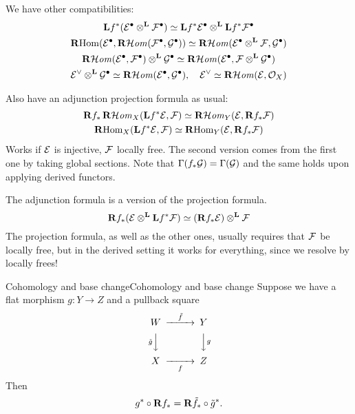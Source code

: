 
We have other compatibilities:
\begin{gather*}
    \mathbf{L} f^*(\mathcal{E}^\bullet\otimes^{\mathbf{L}}\mathcal{F}^\bullet)
        \simeq \mathbf{L} f^*\mathcal{E}^\bullet\otimes^{\mathbf{L}}\mathbf{L} f^*\mathcal{F}^\bullet \\
    \operatorname{\mathbf{R} Hom}(\mathcal{E}^\bullet,\operatorname{\mathbf{R}\mathcal{H}\mathit{om}}(\mathcal{F}^\bullet,\mathcal{G}^\bullet))
        \simeq \operatorname{\mathbf{R}\mathcal{H}\mathit{om}}(\mathcal{E}^\bullet\otimes^{\mathbf{L}}\mathcal{F},\mathcal{G}^\bullet) \\
    \operatorname{\mathbf{R}\mathcal{H}\mathit{om}}(\mathcal{E}^\bullet,\mathcal{F}^\bullet)\otimes^{\mathbf{L}}\mathcal{G}^\bullet
        \simeq \operatorname{\mathbf{R}\mathcal{H}\mathit{om}}(\mathcal{E}^\bullet,\mathcal{F}\otimes^{\mathbf{L}}\mathcal{G}^\bullet)\\
    \mathcal{E}^\vee\otimes^{\mathbf{L}}\mathcal{G}^\bullet
        \simeq \operatorname{\mathbf{R}\mathcal{H}\mathit{om}}(\mathcal{E}^\bullet,\mathcal{G}^\bullet), \quad
    \mathcal{E}^\vee
        \simeq \operatorname{\mathbf{R}\mathcal{H}\mathit{om}}(\mathcal{E},\mathcal{O}_X)
\end{gather*}

Also have an adjunction projection formula as usual:
\begin{gather*}
    \mathbf{R} f_*\operatorname{\mathbf{R}\mathcal{H}\mathit{om}}_X(\mathbf{L} f^*\mathcal{E},\mathcal{F})
        \simeq \operatorname{\mathbf{R}\mathcal{H}\mathit{om}}_Y(\mathcal{E},\mathbf{R} f_*\mathcal{F}) \\
    \operatorname{\mathbf{R} Hom}_X(\mathbf{L} f^*\mathcal{E},\mathcal{F})
        \simeq \operatorname{\mathbf{R} Hom}_Y(\mathcal{E},\mathbf{R} f_*\mathcal{F})
\end{gather*}
Works if $\mathcal{E}$ is injective, $\mathcal{F}$ locally free. The second version comes from the first one by taking global sections. Note that $\Gamma(f_*\mathcal{G})=\Gamma(\mathcal{G})$ and the same holds upon applying derived functors.

The adjunction formula is a version of the projection formula.
\begin{equation*}
    \mathbf{R} f_*(\mathcal{E}\otimes^{\mathbf{L}}\mathbf{L} f^*\mathcal{F})
        \simeq (\mathbf{R} f_*\mathcal{E})\otimes^{\mathbf{L}}\mathcal{F}
\end{equation*}
The projection formula, as well as the other ones, usually requires that $\mathcal{F}$ be locally free, but in the derived setting it works for everything, since we resolve by locally frees!

\begin{theorem}{Cohomology and base change}{Cohomology and base change}
    Suppose we have a flat morphism $g:Y\to Z$ and a pullback square
    \begin{equation*}
        \begin{CD}
            W @>\tilde f>> Y \\
              @V\tilde gVV @VVgV \\
            X @>>f> Z
        \end{CD}
    \end{equation*}
    Then
    \begin{equation*}
        g^*\circ\mathbf{R} f_*=\mathbf{R}\tilde f_*\circ\tilde g^*.
    \end{equation*}
\end{theorem}

